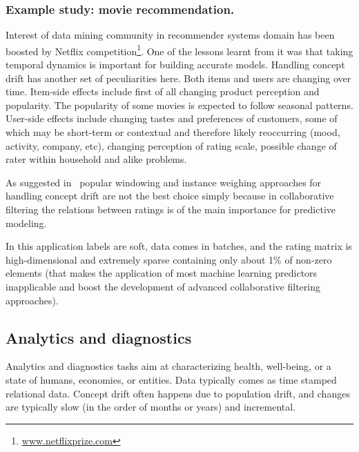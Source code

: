 \documentclass{llncs}
\begin{document}
\subsubsection{Example study: movie recommendation.}


Interest of data mining community in recommender systems domain has been boosted by Netflix competition\footnote{\url{www.netflixprize.com}}. One of the lessons learnt
from it was that taking temporal dynamics is important for building accurate models.
Handling concept drift has another set of peculiarities here.
Both items and users are changing over time. Item-side effects include first of all changing product perception and popularity.
The popularity of some movies is expected to follow seasonal patterns.
User-side effects include changing tastes and preferences of customers, some of
which may be short-term or contextual and therefore likely reoccurring
(mood, activity, company, etc), changing perception of rating scale,
possible change of rater within household and alike problems.

As suggested in~\cite{Koren10} popular windowing and instance weighing approaches
for handling concept drift are not the best choice simply because
in collaborative filtering the relations between ratings is of the main importance for predictive modeling.

In this application labels are soft, data comes in batches, and the rating matrix is high-dimensional and extremely sparse containing only about 1\% of non-zero elements (that makes the application of most machine learning predictors inapplicable and boost the development of advanced collaborative filtering approaches).



\subsection{Analytics and diagnostics}

Analytics and diagnostics tasks aim at characterizing health, well-being, or a state of humans, economies, or entities.
Data typically comes as time stamped relational data. Concept drift often happens due to population drift,
and changes are typically slow (in the order of months or years) and incremental.
\end{document}

